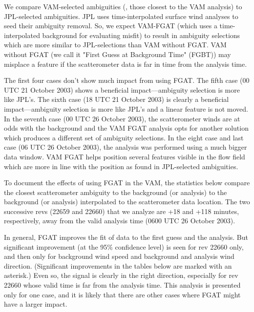 \documentclass[12pt,titlepage]{article}
\begin{document}
We compare VAM-selected ambiguities (\ie, those closest to
the VAM analysis) to JPL-selected ambiguities.  JPL uses
time-interpolated surface wind analyses to seed their ambiguity
removal.  So, we expect VAM-FGAT (which uses a time-interpolated
background for evaluating misfit) to result in ambiguity selections
which are more similar to JPL-selections than VAM without FGAT.  VAM
without FGAT (we call it "First Guess at Background Time" (FGBT)) may
misplace a feature if the scatterometer data is far in time from the
analysis time.

The first four cases don't show much impact from using FGAT.
The fifth case (00 UTC 21 October 2003) shows a beneficial
impact---ambiguity selection is more like JPL's.
The sixth case (18 UTC 21 October 2003) is clearly a beneficial
impact---ambiguity selection is more like JPL's and a linear feature
is not moved.
In the seventh case (00 UTC 26 October 2003), the scatterometer winds
are at odds with the background and the VAM FGAT analysis opts for
another solution which produces a different set of ambiguity
selections.
In the eight case and last case (06 UTC 26 October 2003), the analysis
was performed using a much bigger data window.
VAM FGAT helps position several features visible in the flow field
which are more in line with the position as found in JPL-selected
ambiguities.


To document the effects of using FGAT in the VAM, the statistics below
compare the closest scatterometer ambiguity to the background (or
analysis) to the background (or analysis) interpolated to the
scatterometer data location.  
The two successive revs (22659 and 22660) that we analyze are +18 and
+118 minutes, respectively, away from the valid analysis time (0600
UTC 26 October 2003).

In general, FGAT improves the fit of data to the first guess
and the analysis.  But significant improvement (at the 95\% confidence
level) is seen for rev 22660 only, and then only for background wind speed
and background and analysis wind direction.  (Significant improvements
in the tables below are marked with an asterisk.)  Even so, the signal
is clearly in the right direction, especially for rev 22660 whose valid
time is far from the analysis time.  This analysis is presented only
for one case, and it is likely that there are other cases where FGAT
might have a larger impact.
\end{document}
